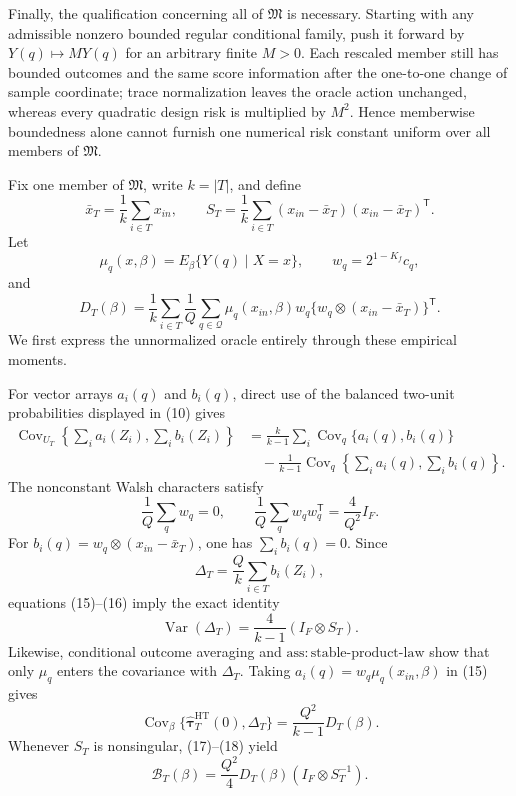 Finally, the qualification concerning all of \(\mathfrak M\) is necessary.  Starting with any admissible nonzero bounded regular conditional family, push it forward by \(Y(q)\mapsto M Y(q)\) for an arbitrary finite \(M>0\).  Each rescaled member still has bounded outcomes and the same score information after the one-to-one change of sample coordinate; trace normalization leaves the oracle action unchanged, whereas every quadratic design risk is multiplied by \(M^2\).  Hence memberwise boundedness alone cannot furnish one numerical risk constant uniform over all members of \(\mathfrak M\).

Fix one member of \(\mathfrak M\), write \(k=|T|\), and define
\[
\bar x_T=\frac1k\sum_{i\in T}x_{in},
\qquad
S_T=\frac1k\sum_{i\in T}
(x_{in}-\bar x_T)(x_{in}-\bar x_T)^{\mathsf T}.
\]
Let
\[
\mu_q(x,\beta)=E_\beta\{Y(q)\mid X=x\},
\qquad w_q=2^{1-K_f}c_q,
\]
and
\[
D_T(\beta)
=\frac1k\sum_{i\in T}\frac1Q\sum_{q\in\mathcal Q}
\mu_q(x_{in},\beta)w_q
\{w_q\otimes(x_{in}-\bar x_T)\}^{\mathsf T}.
\tag{14}
\]
We first express the unnormalized oracle entirely through these empirical moments.

For vector arrays \(a_i(q)\) and \(b_i(q)\), direct use of the balanced two-unit probabilities displayed in (10) gives
\[
\begin{aligned}
\operatorname{Cov}_{U_T}\!\left\{\sum_i a_i(Z_i),\sum_i b_i(Z_i)\right\}
&=\frac{k}{k-1}\sum_i\operatorname{Cov}_q\{a_i(q),b_i(q)\}\\
&\quad-\frac1{k-1}
\operatorname{Cov}_q\!\left\{\sum_i a_i(q),\sum_i b_i(q)\right\}.
\end{aligned}
\tag{15}
\]
The nonconstant Walsh characters satisfy
\[
\frac1Q\sum_qw_q=0,
\qquad
\frac1Q\sum_qw_qw_q^{\mathsf T}=\frac4{Q^2}I_F.
\tag{16}
\]
For \(b_i(q)=w_q\otimes(x_{in}-\bar x_T)\), one has \(\sum_i b_i(q)=0\).  Since
\[
\Delta_T=\frac Qk\sum_{i\in T}b_i(Z_i),
\]
equations (15)--(16) imply the exact identity
\[
\operatorname{Var}(\Delta_T)
=\frac4{k-1}(I_F\otimes S_T).
\tag{17}
\]
Likewise, conditional outcome averaging and \(\mathrm{ass{:}stable\text{-}product\text{-}law}\) show that only \(\mu_q\) enters the covariance with \(\Delta_T\).  Taking \(a_i(q)=w_q\mu_q(x_{in},\beta)\) in (15) gives
\[
\operatorname{Cov}_\beta\{
\widehat{\boldsymbol\tau}^{\mathrm{HT}}_T(0),\Delta_T\}
=\frac{Q^2}{k-1}D_T(\beta).
\tag{18}
\]
Whenever \(S_T\) is nonsingular, (17)--(18) yield
\[
\mathcal B_T(\beta)
=\frac{Q^2}{4}D_T(\beta)(I_F\otimes S_T^{-1}).
\tag{19}
\]


